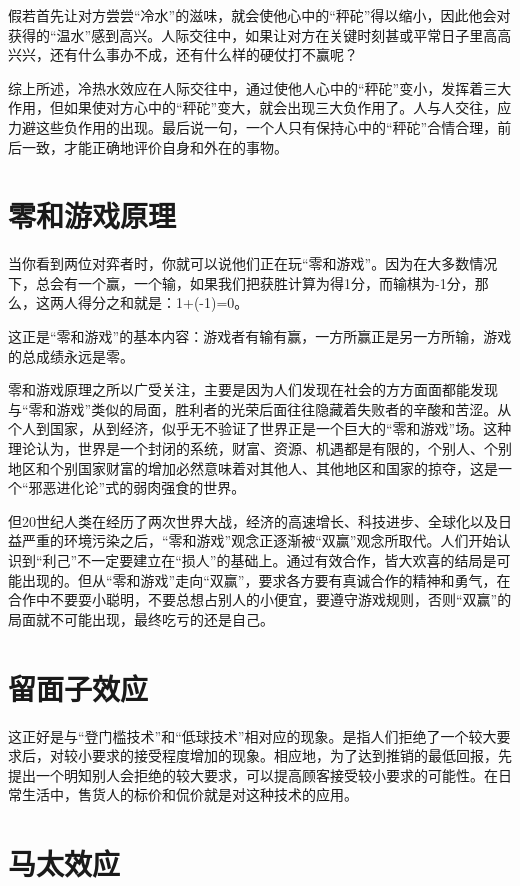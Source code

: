 \documentclass[11pt]{ctexart}
\begin{document}
假若首先让对方尝尝“冷水”的滋味，就会使他心中的“秤砣”得以缩小，因此他会对获得的“温水”感到高兴。人际交往中，如果让对方在关键时刻甚或平常日子里高高兴兴，还有什么事办不成，还有什么样的硬仗打不赢呢？

综上所述，冷热水效应在人际交往中，通过使他人心中的“秤砣”变小，发挥着三大作用，但如果使对方心中的“秤砣”变大，就会出现三大负作用了。人与人交往，应力避这些负作用的出现。最后说一句，一个人只有保持心中的“秤砣”合情合理，前后一致，才能正确地评价自身和外在的事物。
\section{零和游戏原理}
\label{sec-62}


当你看到两位对弈者时，你就可以说他们正在玩“零和游戏”。因为在大多数情况下，总会有一个赢，一个输，如果我们把获胜计算为得1分，而输棋为-1分，那么，这两人得分之和就是：1+(-1)=0。

这正是“零和游戏”的基本内容：游戏者有输有赢，一方所赢正是另一方所输，游戏的总成绩永远是零。

零和游戏原理之所以广受关注，主要是因为人们发现在社会的方方面面都能发现与“零和游戏”类似的局面，胜利者的光荣后面往往隐藏着失败者的辛酸和苦涩。从个人到国家，从到经济，似乎无不验证了世界正是一个巨大的“零和游戏”场。这种理论认为，世界是一个封闭的系统，财富、资源、机遇都是有限的，个别人、个别地区和个别国家财富的增加必然意味着对其他人、其他地区和国家的掠夺，这是一个“邪恶进化论”式的弱肉强食的世界。

但20世纪人类在经历了两次世界大战，经济的高速增长、科技进步、全球化以及日益严重的环境污染之后，“零和游戏”观念正逐渐被“双赢”观念所取代。人们开始认识到“利己”不一定要建立在“损人”的基础上。通过有效合作，皆大欢喜的结局是可能出现的。但从“零和游戏”走向“双赢”，要求各方要有真诚合作的精神和勇气，在合作中不要耍小聪明，不要总想占别人的小便宜，要遵守游戏规则，否则“双赢”的局面就不可能出现，最终吃亏的还是自己。
\section{留面子效应}
\label{sec-63}


这正好是与“登门槛技术”和“低球技术”相对应的现象。是指人们拒绝了一个较大要求后，对较小要求的接受程度增加的现象。相应地，为了达到推销的最低回报，先提出一个明知别人会拒绝的较大要求，可以提高顾客接受较小要求的可能性。在日常生活中，售货人的标价和侃价就是对这种技术的应用。
\section{马太效应}
\label{sec-64}
\end{document}

